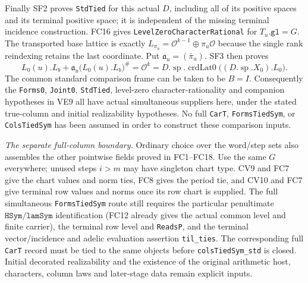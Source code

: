 Finally SF2 proves \texttt{StdTied} for this actual $D$, including
all of its positive spaces and its terminal positive space; it is
independent of the missing terminal incidence construction. FC16 gives
\texttt{LevelZeroCharacterRational} for $T_u.\texttt{gl}=G$.
The transported base lattice is exactly
$L_{\pi_u}=\mathcal O^{k-1}\oplus\pi_u\mathcal O$ because the
single rank reindexing retains the last coordinate. Put
$\mathfrak a_u=(\bar\pi_u)$. SF3 then proves
\[
 L_0(u).L_b+\mathfrak a_u\bigl(L_0(u).L_b\bigr)^\#
       =\mathcal O^k
       =D.\operatorname{sp}.\operatorname{crdLat0}
                         \bigl((D.\operatorname{sp}.X_0).L_0\bigr).
 \tag{FC.41}
\]
The common standard comparison frame can be taken to be $B=I$.
Consequently the \texttt{Forms0}, \texttt{Joint0}, \texttt{StdTied},
level-zero character-rationality and companion hypotheses in VE9 all
have actual simultaneous suppliers here, under the stated true-column
and initial realizability hypotheses. No full \texttt{CarT},
\texttt{FormsTiedSym}, or \texttt{ColsTiedSym} has been assumed in
order to construct these comparison inputs.

\emph{The separate full-column boundary.}
Ordinary choice over the word/step sets also assembles the other
pointwise fields proved in FC1--FC18. Use the same $G$ everywhere;
unused steps $i>m$ may have singleton chart type. CV9 and FC7 give
the chart values and norm ties, FC8 gives the period tie, and CV10
and FC7 give terminal row values and norms once its row chart is
supplied. The full simultaneous \texttt{FormsTiedSym} route still
requires the particular penultimate $\texttt{HSym}/\texttt{lamSym}$
identification (FC12 already gives the actual common level and finite
carrier), the terminal row level and \texttt{ReadsP}, and the terminal
vector/incidence and adelic evaluation assertion \texttt{til\_ties}.
The corresponding full \texttt{CarT} record must be tied to the same
objects before \texttt{colsTiedSym\_std} is closed. Initial decorated
realizability and the existence of the original arithmetic host,
characters, column laws and later-stage data remain explicit inputs.
